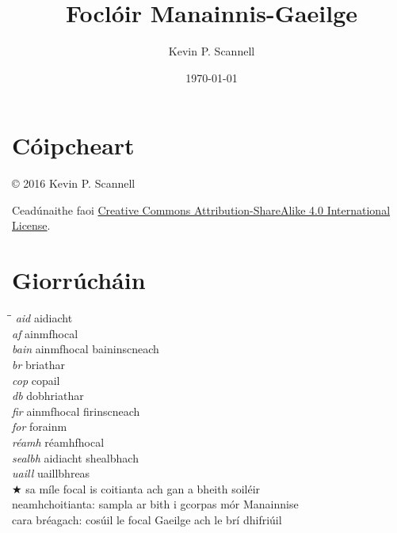 \documentclass[10pt,twocolumn,openany]{book}
\begin{document}
\begin{frontmatter}
\title{\Huge\bf Focl\'oir Manainnis-Gaeilge}
\author{{\Large Kevin P. Scannell}}
\date{\today}
\maketitle
\onecolumn


\newpage
\chapter*{C\'oipcheart} 

\vfill

\copyright \hspace{0.6ex} 2016 Kevin P. Scannell

\vspace{1ex}

Ceadúnaithe faoi 
\href{http://creativecommons.org/licenses/by-sa/4.0/}{Creative Commons Attribution-ShareAlike 4.0 International License}.



\newpage
\chapter*{Giorr\'uch\'ain} 
\begin{tabbing}
\hspace*{20ex}\=\hspace{16ex}\=\kill
\> {\it aid} \> aidiacht \\
\> {\it af} \> ainmfhocal \\
\> {\it bain} \> ainmfhocal baininscneach \\
\> {\it br} \> briathar \\
\> {\it cop} \> copail \\
\> {\it db} \> dobhriathar \\
\> {\it fir} \> ainmfhocal firinscneach \\
\> {\it for} \> forainm \\
\> {\it réamh} \> réamhfhocal \\
\> {\it sealbh} \> aidiacht shealbhach \\
\> {\it uaill} \> uaillbhreas \\
\> $\bigstar$ \> sa míle focal is coitianta ach gan a bheith soiléir \\
\> \textdagger \> neamhchoitianta: sampla ar bith i gcorpas mór Manainnise \\
\> \textdbend \> cara bréagach: cosúil le focal Gaeilge ach le brí dhifriúil \\
\end{tabbing}


\end{frontmatter}
\end{document}
